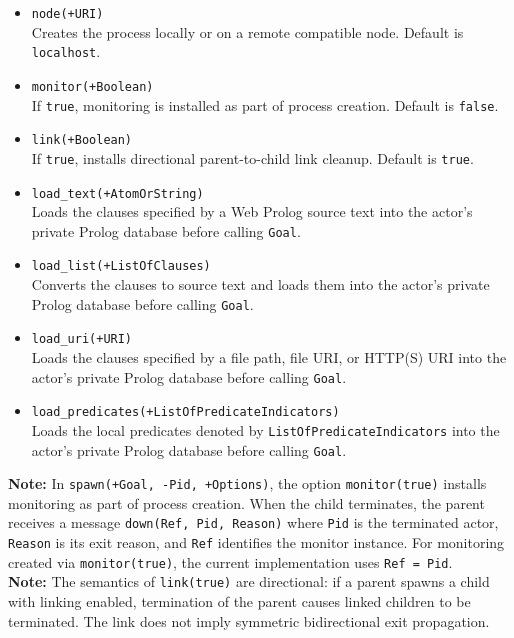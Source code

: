 \begin{itemize}
\item
  \texttt{node(+URI)}\\
  Creates the process locally or on a remote compatible node. Default is
  \texttt{localhost}.
\item
  \texttt{monitor(+Boolean)}\\
  If \texttt{true}, monitoring is installed as part of process creation.
  Default is \texttt{false}.
\item
  \texttt{link(+Boolean)}\\
  If \texttt{true}, installs directional parent-to-child link cleanup.
  Default is \texttt{true}.
\item
  \texttt{load\_text(+AtomOrString)}\\
  Loads the clauses specified by a Web Prolog source text into the actor's
  private Prolog database before calling \texttt{Goal}.
\item
  \texttt{load\_list(+ListOfClauses)}\\
  Converts the clauses to source text and loads them into the actor's private
  Prolog database before calling \texttt{Goal}.
\item
  \texttt{load\_uri(+URI)}\\
  Loads the clauses specified by a file path, file URI, or HTTP(S) URI into
  the actor's private Prolog database before calling \texttt{Goal}.
\item
  \texttt{load\_predicates(+ListOfPredicateIndicators)}\\
  Loads the local predicates denoted by
  \texttt{ListOfPredicateIndicators} into the actor's private Prolog database
  before calling \texttt{Goal}.
\end{itemize}

\noindent \textbf{Note:} In \texttt{spawn(+Goal,\,-Pid,\,+Options)}, the option
\texttt{monitor(true)} installs monitoring as part of process creation. When
the child terminates, the parent receives a message
\texttt{down(Ref,\,Pid,\,Reason)} where \texttt{Pid} is the terminated actor,
\texttt{Reason} is its exit reason, and \texttt{Ref} identifies the monitor
instance. For monitoring created via \texttt{monitor(true)}, the current
implementation uses \texttt{Ref\,=\,Pid}.\\

\smallskip
\noindent \textbf{Note:} The semantics of \texttt{link(true)} are directional:
if a parent spawns a child with linking enabled, termination of the parent
causes linked children to be terminated. The link does not imply symmetric
bidirectional exit propagation.\\

